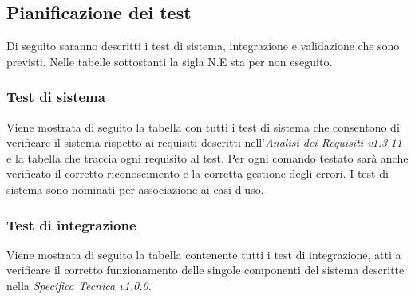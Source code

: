 \documentclass[a4paper]{article}
\begin{document}
	\subsection{Pianificazione dei test}
		Di seguito saranno descritti i test di sistema, integrazione e validazione che sono previsti.
		Nelle tabelle sottostanti la sigla N.E sta per non eseguito.				
	\subsubsection{Test di sistema}
		Viene mostrata di seguito la tabella con tutti i test di sistema che consentono di verificare il sistema rispetto ai requisiti descritti nell'\emph{Analisi dei Requisiti v1.3.11} e la tabella che traccia ogni requisito al test.
		Per ogni comando testato sarà anche verificato il corretto riconoscimento e la corretta gestione degli errori.
		I test di sistema sono nominati per associazione ai casi d'uso.
		
	\subsubsection{Test di integrazione}
		Viene mostrata di seguito la tabella contenente tutti i test di integrazione, atti a verificare il corretto funzionamento delle singole componenti del sistema descritte nella \emph{Specifica Tecnica v1.0.0}. 
			
\end{document}
